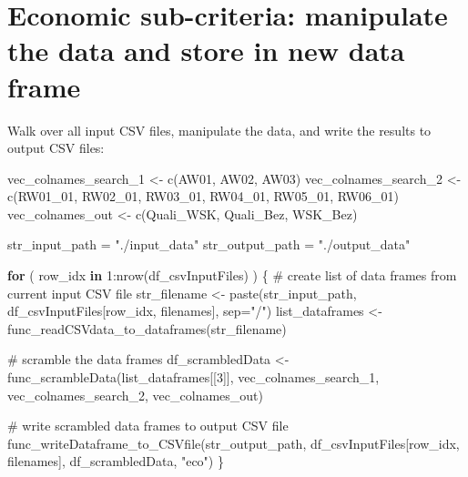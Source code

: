 \documentclass[
]{article}
\newenvironment{Shaded}{\begin{snugshade}}{\end{snugshade}}
\newcommand{\AttributeTok}[1]{\textcolor[rgb]{0.00,0.34,0.68}{#1}}
\newcommand{\CommentTok}[1]{\textcolor[rgb]{0.54,0.53,0.53}{#1}}
\newcommand{\ControlFlowTok}[1]{\textcolor[rgb]{0.12,0.11,0.11}{\textbf{#1}}}
\newcommand{\DecValTok}[1]{\textcolor[rgb]{0.69,0.50,0.00}{#1}}
\newcommand{\FunctionTok}[1]{\textcolor[rgb]{0.39,0.29,0.61}{#1}}
\newcommand{\NormalTok}[1]{\textcolor[rgb]{0.12,0.11,0.11}{#1}}
\newcommand{\OtherTok}[1]{\textcolor[rgb]{0.00,0.43,0.16}{#1}}
\newcommand{\SpecialCharTok}[1]{\textcolor[rgb]{0.24,0.68,0.91}{#1}}
\newcommand{\StringTok}[1]{\textcolor[rgb]{0.75,0.01,0.01}{#1}}
\begin{document}
\hypertarget{economic-sub-criteria-manipulate-the-data-and-store-in-new-data-frame}{%
\section{Economic sub-criteria: manipulate the data and store in new
data
frame}\label{economic-sub-criteria-manipulate-the-data-and-store-in-new-data-frame}}

Walk over all input CSV files, manipulate the data, and write the
results to output CSV files:

\begin{Shaded}
\begin{Highlighting}[]
\NormalTok{vec\_colnames\_search\_1 }\OtherTok{\textless{}{-}} \FunctionTok{c}\NormalTok{(}\StringTok{\textquotesingle{}AW01\textquotesingle{}}\NormalTok{, }\StringTok{\textquotesingle{}AW02\textquotesingle{}}\NormalTok{, }\StringTok{\textquotesingle{}AW03\textquotesingle{}}\NormalTok{)}
\NormalTok{vec\_colnames\_search\_2 }\OtherTok{\textless{}{-}} \FunctionTok{c}\NormalTok{(}\StringTok{\textquotesingle{}RW01\_01\textquotesingle{}}\NormalTok{, }\StringTok{\textquotesingle{}RW02\_01\textquotesingle{}}\NormalTok{, }\StringTok{\textquotesingle{}RW03\_01\textquotesingle{}}\NormalTok{, }\StringTok{\textquotesingle{}RW04\_01\textquotesingle{}}\NormalTok{, }\StringTok{\textquotesingle{}RW05\_01\textquotesingle{}}\NormalTok{, }\StringTok{\textquotesingle{}RW06\_01\textquotesingle{}}\NormalTok{)}
\NormalTok{vec\_colnames\_out }\OtherTok{\textless{}{-}} \FunctionTok{c}\NormalTok{(}\StringTok{\textquotesingle{}Quali\_WSK\textquotesingle{}}\NormalTok{, }\StringTok{\textquotesingle{}Quali\_Bez\textquotesingle{}}\NormalTok{, }\StringTok{\textquotesingle{}WSK\_Bez\textquotesingle{}}\NormalTok{)}

\NormalTok{str\_input\_path }\OtherTok{=} \StringTok{"./input\_data"}
\NormalTok{str\_output\_path }\OtherTok{=} \StringTok{"./output\_data"}

\ControlFlowTok{for}\NormalTok{ ( row\_idx }\ControlFlowTok{in} \DecValTok{1}\SpecialCharTok{:}\FunctionTok{nrow}\NormalTok{(df\_csvInputFiles) ) \{}
  \CommentTok{\# create list of data frames from current input CSV file}
\NormalTok{  str\_filename }\OtherTok{\textless{}{-}} \FunctionTok{paste}\NormalTok{(str\_input\_path, df\_csvInputFiles[row\_idx, filenames], }\AttributeTok{sep=}\StringTok{"/"}\NormalTok{)}
\NormalTok{  list\_dataframes }\OtherTok{\textless{}{-}} \FunctionTok{func\_readCSVdata\_to\_dataframes}\NormalTok{(str\_filename)}
  
  \CommentTok{\# scramble the data frames}
\NormalTok{  df\_scrambledData }\OtherTok{\textless{}{-}} \FunctionTok{func\_scrambleData}\NormalTok{(list\_dataframes[[}\DecValTok{3}\NormalTok{]], vec\_colnames\_search\_1, vec\_colnames\_search\_2, vec\_colnames\_out)}
  
  \CommentTok{\# write scrambled data frames to output CSV file}
  \FunctionTok{func\_writeDataframe\_to\_CSVfile}\NormalTok{(str\_output\_path, df\_csvInputFiles[row\_idx, filenames], df\_scrambledData, }\StringTok{"eco"}\NormalTok{)}
\NormalTok{\}}
\end{Highlighting}
\end{Shaded}
\end{document}
